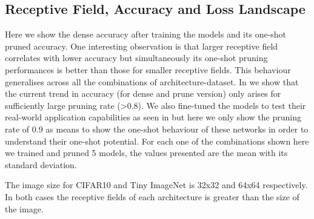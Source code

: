 \subsection{Receptive Field, Accuracy and Loss Landscape}
\label{sec:rfanda}
Here we show the dense accuracy after training the models and its one-shot pruned accuracy. One interesting observation
is that larger receptive field correlates with lower accuracy but simultaneously its one-shot pruning performances is
better than those for smaller receptive fields. This behaviour generalises across all the combinations of
architecture-dataset. In  we show that the current trend in accuracy (for dense and prune version) only
arises for sufficiently large pruning rate (>0.8). We also fine-tuned the models to test their real-world application
capabilities as seen  in  but here we only show the pruning rate of 0.9 as means to
show the one-shot behaviour of these networks in order to understand their one-shot potential.
For each one of the combinations shown here we trained and pruned 5 models, the values presented are the mean  with its
standard deviation.

The image size for CIFAR10 and Tiny ImageNet is 32x32 and  64x64 respectively. In both cases the receptive fields of
each architecture is greater than the size of the image.

